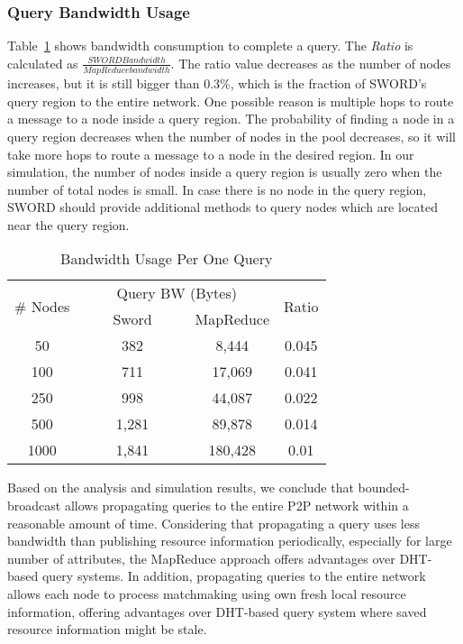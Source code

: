 \documentclass{acm_proc_article-sp}
\begin{document}
\subsubsection{Query Bandwidth Usage}
Table~\ref{table:bw} shows bandwidth consumption to complete a query. The \textit{Ratio} is calculated as \begin{math}\frac{SWORD Bandwidth}{MapReduce bandwidth}\end{math}. The ratio value decreases as the number of nodes
increases, but it is still bigger than 0.3\%, which is the fraction of SWORD's query region to the entire network. One possible reason is multiple hops to route a message to a node inside a query region.
The probability of finding a node in a query region decreases when the number of nodes in the pool decreases, so it will take more hops to route a message to a node in the desired region. 
In our simulation, the number of nodes inside a query region is usually zero when the number of total nodes is small. 
In case there is no node in the query region, SWORD should provide additional methods to query nodes which are located near the query region.
\begin{table}
\centering
\caption{\label{table:bw}Bandwidth Usage Per One Query}
\begin{center}
\begin{tabular}{|c|c|c|c|} \hline
\multirow{2}{*}{\# Nodes}&\multicolumn{2}{|c|}{Query BW (Bytes)}&\multirow{2}{*}{Ratio} \\ \cline{2-3}
\ &\ \ \ \ Sword\ \ \ \ &MapReduce& \\ \hline\hline
50&382&8,444&0.045\\ \hline
100&711&17,069&0.041\\ \hline
250&998&44,087&0.022\\ \hline
500&1,281&89,878&0.014\\ \hline
1000&1,841&180,428&0.01\\ \hline
\end{tabular}
\end{center}
\end{table}

Based on the analysis and simulation results, we conclude that bounded-broadcast allows propagating queries to the entire P2P network within a reasonable amount of time.
Considering that propagating a query uses less bandwidth than publishing resource information periodically, especially for large number of attributes, the MapReduce approach offers advantages over DHT-based query systems. 
In addition, propagating queries to the entire network allows each node to process matchmaking using own fresh local resource information, 
offering advantages over DHT-based query system where saved resource information might be stale.
\end{document}
